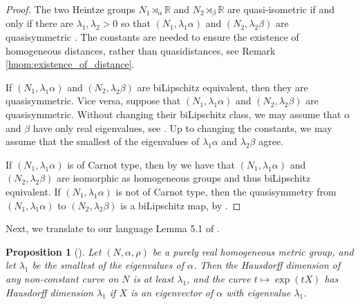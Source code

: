 \documentclass[a4paper,12pt]{amsart}
\theoremstyle{plain}
\theoremstyle{definition}
\theoremstyle{plain}
\newtheorem{prop}[maar]{Proposition}
\theoremstyle{remark}
\begin{document}
\begin{proof}
	The two Heintze groups \( N_1 \rtimes_\alpha \mathbb{R} \) and \( N_2 \rtimes_\beta \mathbb{R} \) are quasi-isometric if and only if there are \( \lambda_1,\lambda_2 > 0 \) so that \( (N_1, \lambda_1 \alpha) \) and \( (N_2, \lambda_2 \beta) \) are quasisymmetric \cite{paulin_bord_hyp, Bonk-Schramm,Cornulier:qihlc}. 
	The constants are needed to ensure the existence of homogeneous distances, rather than quasidistances, see Remark \ref{huom:existence_of_distance}.

	If
	\( (N_1, \lambda_1 \alpha) \) and \( (N_2, \lambda_2 \beta) \) are biLipschitz equivalent, then they are quasisymmetric.
	Vice versa, suppose that 
	\( (N_1, \lambda_1 \alpha) \) and \( (N_2, \lambda_2 \beta) \) are quasisymmetric. 
	Without changing their biLipschitz class, we may assume that \( \alpha \) and \( \beta \) have only real eigen\-values, see \cite[Theorem C]{seba-enrico-dilations}.
	Up to changing the constants, 
	we may assume that the smallest of the eigenvalues of \( \lambda_1 \alpha \) and \( \lambda_2 \beta \) agree.
	
	If \( (N_1,\lambda_1 \alpha) \) is of Carnot type, then 
	by \cite{pansu, avain:carrasco-orlicz,avain:LD-Xie_fibers}
	we have that \( (N_1,\lambda_1 \alpha) \) and \( (N_2,\lambda_2 \beta) \) are isomorphic as homogeneous groups and thus biLipschitz equivalent.
%	
	If \( (N_1,\lambda_1 \alpha) \) is not of Carnot type, then the quasisymmetry from \( (N_1,\lambda_1 \alpha) \)  to \( (N_2,\lambda_2 \beta) \) is a biLipschitz map,
	 by \cite{avain:carrasco-orlicz,avain:LD-Xie_fibers}.
\end{proof}



Next, we translate to our language Lemma 5.1 of \cite{avain:CPS}. 

\begin{prop}[\cite{avain:CPS}]
	\label{prop:CPS-H-dim-lemma}
	Let \( (N,\alpha,\rho) \) be a purely real homogeneous metric group, and let \( \lambda_1 \) be the smallest of the eigenvalues of \( \alpha \).
	Then the Hausdorff dimension of any non-constant curve on \( N \) is at least 
	\( \lambda_1 \), and
	the curve \( t \mapsto \exp(t X) \) has Hausdorff dimension \( \lambda_1 \)  if \( X \) is an eigenvector of \( \alpha \) with eigenvalue \( \lambda_1 \).
\end{prop}
\end{document}

